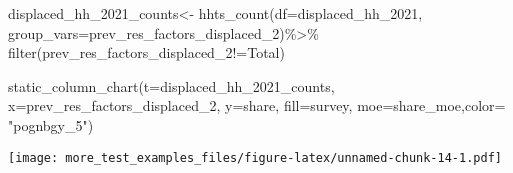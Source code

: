 \documentclass[
]{article}
\newenvironment{Shaded}{\begin{snugshade}}{\end{snugshade}}
\newcommand{\AttributeTok}[1]{\textcolor[rgb]{0.77,0.63,0.00}{#1}}
\newcommand{\FunctionTok}[1]{\textcolor[rgb]{0.00,0.00,0.00}{#1}}
\newcommand{\NormalTok}[1]{#1}
\newcommand{\OtherTok}[1]{\textcolor[rgb]{0.56,0.35,0.01}{#1}}
\newcommand{\SpecialCharTok}[1]{\textcolor[rgb]{0.00,0.00,0.00}{#1}}
\newcommand{\StringTok}[1]{\textcolor[rgb]{0.31,0.60,0.02}{#1}}
\begin{document}
\begin{Shaded}
\begin{Highlighting}[]
\NormalTok{displaced\_hh\_2021\_counts}\OtherTok{\textless{}{-}} \FunctionTok{hhts\_count}\NormalTok{(}\AttributeTok{df=}\NormalTok{displaced\_hh\_2021, }\AttributeTok{group\_vars=}\StringTok{\textquotesingle{}prev\_res\_factors\_displaced\_2\textquotesingle{}}\NormalTok{)}\SpecialCharTok{\%\textgreater{}\%}
\FunctionTok{filter}\NormalTok{(prev\_res\_factors\_displaced\_2}\SpecialCharTok{!=}\StringTok{\textquotesingle{}Total\textquotesingle{}}\NormalTok{)}

\FunctionTok{static\_column\_chart}\NormalTok{(}\AttributeTok{t=}\NormalTok{displaced\_hh\_2021\_counts, }\AttributeTok{x=}\StringTok{\textquotesingle{}prev\_res\_factors\_displaced\_2\textquotesingle{}}\NormalTok{, }\AttributeTok{y=}\StringTok{\textquotesingle{}share\textquotesingle{}}\NormalTok{, }\AttributeTok{fill=}\StringTok{\textquotesingle{}survey\textquotesingle{}}\NormalTok{, }\AttributeTok{moe=}\StringTok{\textquotesingle{}share\_moe\textquotesingle{}}\NormalTok{,}\AttributeTok{color=}  \StringTok{"pognbgy\_5"}\NormalTok{)}
\end{Highlighting}
\end{Shaded}

\texttt{[image: more\_test\_examples\_files/figure-latex/unnamed-chunk-14-1.pdf]}
\end{document}

